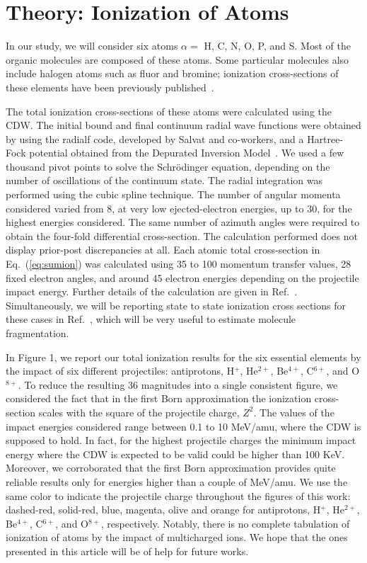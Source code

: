 \documentclass[preprint,12pt]{article}
\begin{document}
\section{Theory: Ionization of Atoms}

In our study, we will consider six atoms $\alpha=$ H, C, N, O, P, and S. 
Most of the organic molecules are composed of these atoms. Some 
particular molecules also include halogen atoms such as fluor and 
bromine; ionization cross-sections of these elements have been 
previously published~\cite{miraglia2008,miraglia2009}.

The total ionization cross-sections of these atoms were calculated using 
the CDW. The initial bound and final continuum radial wave functions 
were obtained by using the {\sc radialf} code, developed by Salvat and 
co-workers, and a Hartree-Fock potential obtained from the Depurated 
Inversion Model~\cite{mendez2016,mendez2018}. 
We used a few thousand pivot points to solve the Schr\"{o}dinger 
equation, depending on the number of oscillations of the continuum 
state. The radial integration was performed using the 
cubic spline technique. The number of angular momenta considered 
varied from 8, at very low ejected-electron energies, up to 30, 
for the highest energies considered. The same number of azimuth 
angles were required to obtain the four-fold differential 
cross-section. The calculation performed does not display prior-post 
discrepancies at all. Each atomic total cross-section in 
Eq.~(\ref{eq:sumion}) was calculated using 35 to 100 momentum transfer 
values, 28 fixed electron angles, and around 45 electron energies 
depending on the projectile impact energy. Further details of the 
calculation are given in Ref.~\cite{montanari2017}. Simultaneously, we 
will be reporting state to state ionization cross sections for these 
cases in Ref.~\cite{miraglia2019}, which will be very useful to estimate 
molecule fragmentation.

In Figure 1, we report our total ionization results for the six 
essential elements by the impact of six different projectiles: 
antiprotons, H$^{+}$, He$^{2+}$, Be$^{4+}$, C$^{6+}$, and O$^{8+}$. 
To reduce the resulting 36 magnitudes into a single consistent 
figure, we considered the fact that in the first Born approximation
the ionization cross-section scales with the square of the projectile 
charge, $Z^{2}$. The values of the impact energies considered 
range between 0.1 to 10 MeV/amu, where the CDW is supposed 
to hold. In fact, for the highest projectile charges the minimum 
impact energy where the CDW is expected to be valid could be 
higher than 100 KeV. Moreover, we corroborated that the first Born 
approximation provides quite reliable results only for energies higher 
than a couple of MeV/amu. We use the same color to indicate the 
projectile charge throughout the figures of this work: dashed-red, 
solid-red, blue, magenta, olive and orange for antiprotons, 
H$^{+}$, He$^{2+}$, Be$^{4+}$, C$^{6+}$, and O$^{8+}$, respectively. 
Notably, there is no complete tabulation of ionization of atoms by 
the impact of multicharged ions. We hope that the ones presented 
in this article will be of help for future works. 
\end{document}
